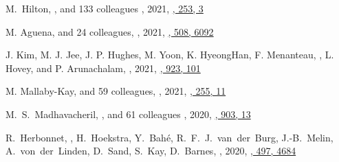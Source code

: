\begin{etaremune}
\item
M.~Hilton, \myself, and 133 colleagues
,
2021, \href{https://ui.adsabs.harvard.edu/abs/2021ApJS..253....3H/abstract}{\apjs, 253, 3}

\item
M. Aguena, and 24 colleagues,
,
2021, \href{https://ui.adsabs.harvard.edu/abs/2021MNRAS.508.6092A}{\mnras, 508, 6092}

\item
J. Kim, M. J. Jee, J. P. Hughes, M. Yoon, K. HyeongHan, F. Menanteau, \myself, L. Hovey, and P. Arunachalam,
,
2021, \href{https://ui.adsabs.harvard.edu/abs/2021ApJ...923..101K}{\apj, 923, 101}

\item
M. Mallaby-Kay, and 59 colleagues,
,
2021, \href{https://ui.adsabs.harvard.edu/abs/2021ApJS..255...11M}{\apjs, 255, 11}

\item
M.~S.~Madhavacheril, \myself, and 61 colleagues
,
2020, \href{https://ui.adsabs.harvard.edu/abs/2020ApJ...903L..13M/abstract}{\apjl, 903, 13}

\item
R.~Herbonnet, \myself, H.~Hoekstra, Y.~Bah\'e, R.~F.~J.~van~der~Burg, 
J.-B.~Melin, A.~von~der~Linden, D.~Sand, S.~Kay, D.~Barnes,
,
2020, \href{https://ui.adsabs.harvard.edu/abs/2020MNRAS.497.4684H/abstract}{\mnras, 497, 4684}


\end{etaremune}

